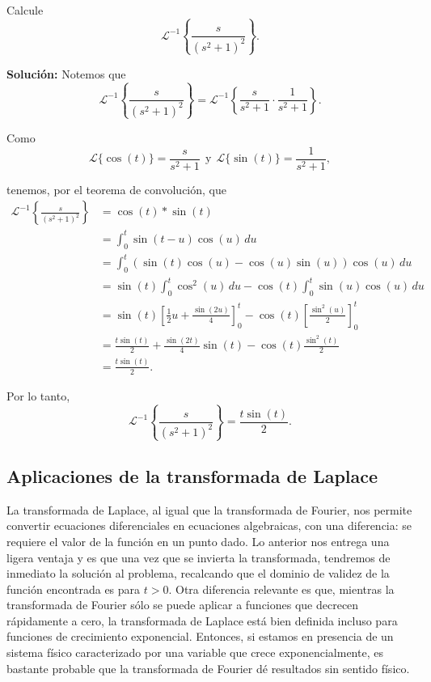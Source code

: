 \begin{ejemplo}
Calcule
$$\mathcal{L}^{-1} \left\{ \frac{s}{(s^2+1)^2} \right\}.$$

\textbf{Solución:} Notemos que 
\begin{equation*}
\mathcal{L}^{-1} \left\{ \frac{s}{(s^2+1)^2} \right\} = \mathcal{L}^{-1} \left\{ \frac{s}{s^2+1} \cdot \frac{1}{s^2+1} \right\}.
\end{equation*}

Como
\begin{equation*}
\mathcal{L}\{\cos(t)\} = \frac{s}{s^2+1} ~~\mbox{y}~~ \mathcal{L}\{\sin(t)\} = \frac{1}{s^2+1},
\end{equation*}

tenemos, por el teorema de convolución, que
\begin{align*}
    \mathcal{L}^{-1} \left\{ \frac{s}{(s^2+1)^2} \right\} &=\cos(t) *\sin(t)  \\
    &= \int_0^t \sin(t-u) \cos(u) \,du \\
    &= \int_0^t (\sin(t) \cos(u) - \cos(u) \sin(u)) \cos(u) \,du  \\
    &= \sin(t) \int_0^t \cos^2(u) \,du - \cos(t) \int_0^t \sin (u) \cos(u) \,du \\
    &= \sin(t) \left[ \frac{1}{2} u + \frac{\sin(2u)}{4} \right]_0^t - \cos(t) \left[ \frac{\sin^2(u)}{2} \right]_0^t \\
    &= \frac{t \sin(t)}{2} + \frac{\sin(2t)}{4} \sin(t) - \cos(t) \frac{\sin^2(t)}{2} \\
    &= \frac{t \sin(t) }{2}.
\end{align*}

Por lo tanto,
$$\mathcal{L}^{-1} \left\{ \frac{s}{(s^2+1)^2} \right\} = \frac{t \sin(t) }{2}.$$   
\end{ejemplo}

\subsection{Aplicaciones de la transformada de Laplace}

La transformada de Laplace, al igual que la transformada de Fourier, nos permite convertir ecuaciones diferenciales en ecuaciones algebraicas, con una diferencia: se requiere el valor de la función en un punto dado. Lo anterior nos entrega una ligera ventaja y es que una vez que se invierta la transformada, tendremos de inmediato la solución al problema, recalcando que el dominio de validez de la función encontrada es para $t > 0$. Otra diferencia relevante es que, mientras la transformada de Fourier sólo se puede aplicar a funciones que decrecen rápidamente a cero, la transformada de Laplace está bien definida incluso para funciones de crecimiento exponencial. Entonces, si estamos en presencia de un sistema físico caracterizado por una variable que crece exponencialmente, es bastante probable que la transformada de Fourier dé resultados sin sentido físico.

